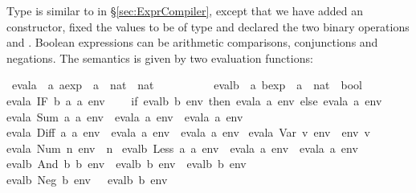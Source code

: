 \begin{isabellebody}
\begin{isamarkuptext}
\noindent
Type  is similar to  in \S\ref{sec:ExprCompiler},
except that we have added an  constructor,
fixed the values to be of type  and declared the two binary
operations  and .  Boolean
expressions can be arithmetic comparisons, conjunctions and negations.
The semantics is given by two evaluation functions:%
\end{isamarkuptext}%
\isamarkuptrue%
\isamarkupfalse%
\ evala\ {\isacharcolon}{\isacharcolon}\ {\isachardoublequoteopen}{\isacharprime}a\ aexp\ {\isasymRightarrow}\ {\isacharparenleft}{\isacharprime}a\ {\isasymRightarrow}\ nat{\isacharparenright}\ {\isasymRightarrow}\ nat{\isachardoublequoteclose}\ \isanewline
\ \ \ \ \ \ \ \ \ evalb\ {\isacharcolon}{\isacharcolon}\ {\isachardoublequoteopen}{\isacharprime}a\ bexp\ {\isasymRightarrow}\ {\isacharparenleft}{\isacharprime}a\ {\isasymRightarrow}\ nat{\isacharparenright}\ {\isasymRightarrow}\ bool{\isachardoublequoteclose}\ \isanewline
{\isachardoublequoteopen}evala\ {\isacharparenleft}IF\ b\ a{}\ a{}{\isacharparenright}\ env\ {\isacharequal}\isanewline
\ \ \ {\isacharparenleft}if\ evalb\ b\ env\ then\ evala\ a{}\ env\ else\ evala\ a{}\ env{\isacharparenright}{\isachardoublequoteclose}\ {\isacharbar}\isanewline
{\isachardoublequoteopen}evala\ {\isacharparenleft}Sum\ a{}\ a{}{\isacharparenright}\ env\ {\isacharequal}\ evala\ a{}\ env\ {\isacharplus}\ evala\ a{}\ env{\isachardoublequoteclose}\ {\isacharbar}\isanewline
{\isachardoublequoteopen}evala\ {\isacharparenleft}Diff\ a{}\ a{}{\isacharparenright}\ env\ {\isacharequal}\ evala\ a{}\ env\ {\isacharminus}\ evala\ a{}\ env{\isachardoublequoteclose}\ {\isacharbar}\isanewline
{\isachardoublequoteopen}evala\ {\isacharparenleft}Var\ v{\isacharparenright}\ env\ {\isacharequal}\ env\ v{\isachardoublequoteclose}\ {\isacharbar}\isanewline
{\isachardoublequoteopen}evala\ {\isacharparenleft}Num\ n{\isacharparenright}\ env\ {\isacharequal}\ n{\isachardoublequoteclose}\ {\isacharbar}\isanewline
\isanewline
{\isachardoublequoteopen}evalb\ {\isacharparenleft}Less\ a{}\ a{}{\isacharparenright}\ env\ {\isacharequal}\ {\isacharparenleft}evala\ a{}\ env\ {\isacharless}\ evala\ a{}\ env{\isacharparenright}{\isachardoublequoteclose}\ {\isacharbar}\isanewline
{\isachardoublequoteopen}evalb\ {\isacharparenleft}And\ b{}\ b{}{\isacharparenright}\ env\ {\isacharequal}\ {\isacharparenleft}evalb\ b{}\ env\ {\isasymand}\ evalb\ b{}\ env{\isacharparenright}{\isachardoublequoteclose}\ {\isacharbar}\isanewline
{\isachardoublequoteopen}evalb\ {\isacharparenleft}Neg\ b{\isacharparenright}\ env\ {\isacharequal}\ {\isacharparenleft}{\isasymnot}\ evalb\ b\ env{\isacharparenright}{\isachardoublequoteclose}%
\begin{isamarkuptext}%
\noindent


\end{isamarkuptext}
\end{isabellebody}

